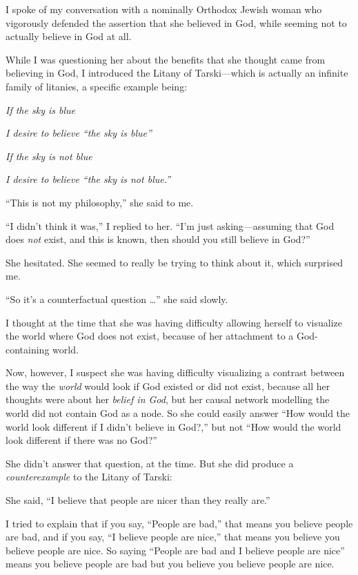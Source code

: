 {
 I spoke of my conversation with a nominally Orthodox Jewish woman
who vigorously defended the assertion that she believed in God, while
seeming not to actually believe in God at all. }

{
 While I was questioning her about the benefits that she thought
came from believing in God, I introduced the Litany of Tarski---which
is actually an infinite family of litanies, a specific example being:}

{
 \textit{If the sky is blue}}

{
 \textit{I desire to believe ``the sky is
blue''}}

{
 \textit{If the sky is not blue}}

{
 \textit{I desire to believe ``the sky is not
blue.''}}

{
 ``This is not my philosophy,''
she said to me.}

{
 ``I didn't think it
was,'' I replied to her.
``I'm just asking---assuming that God
does \textit{not} exist, and this is known, then should you still
believe in God?''}

{
 She hesitated. She seemed to really be trying to think about it,
which surprised me.}

{
 ``So it's a counterfactual
question \ldots'' she said slowly.}

{
 I thought at the time that she was having difficulty allowing
herself to visualize the world where God does not exist, because of her
attachment to a God-containing world.}

{
 Now, however, I suspect she was having difficulty visualizing a
contrast between the way the \textit{world} would look if God existed
or did not exist, because all her thoughts were about her
\textit{belief in God}, but her causal network modelling the world did
not contain God as a node. So she could easily answer
``How would the world look different if I
didn't believe in God?,'' but not
``How would the world look different if there was no
God?''}

{
 She didn't answer that question, at the time. But
she did produce a \textit{counterexample} to the Litany of Tarski:}

{
 She said, ``I believe that people are nicer than
they really are.''}

{
 I tried to explain that if you say, ``People are
bad,'' that means you believe people are bad, and if
you say, ``I believe people are
nice,'' that means you believe you believe people are
nice. So saying ``People are bad and I believe people
are nice'' means you believe people are bad but you
believe you believe people are nice.}

